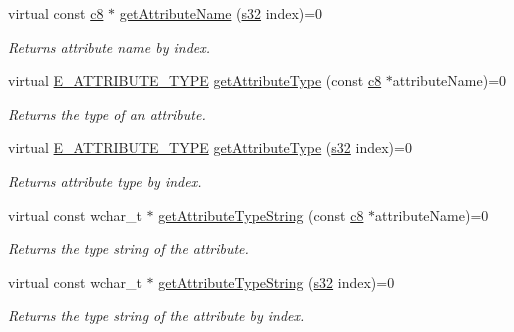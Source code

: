 \begin{DoxyCompactItemize}
virtual const \hyperlink{namespaceirr_a9395eaea339bcb546b319e9c96bf7410}{c8} $\ast$ \hyperlink{classirr_1_1io_1_1IAttributes_adee33f518d95a1ca17146bb055c6e5f3}{get\+Attribute\+Name} (\hyperlink{namespaceirr_ac66849b7a6ed16e30ebede579f9b47c6}{s32} index)=0
\begin{DoxyCompactList}\small\item\em Returns attribute name by index. \end{DoxyCompactList}\item 
virtual \hyperlink{namespaceirr_1_1io_a874a5f14dbe2e45c40c2bb29e9f0ebcb}{E\+\_\+\+A\+T\+T\+R\+I\+B\+U\+T\+E\+\_\+\+T\+Y\+PE} \hyperlink{classirr_1_1io_1_1IAttributes_af14805d54f8cfae0a76751d13931390a}{get\+Attribute\+Type} (const \hyperlink{namespaceirr_a9395eaea339bcb546b319e9c96bf7410}{c8} $\ast$attribute\+Name)=0
\begin{DoxyCompactList}\small\item\em Returns the type of an attribute. \end{DoxyCompactList}\item 
virtual \hyperlink{namespaceirr_1_1io_a874a5f14dbe2e45c40c2bb29e9f0ebcb}{E\+\_\+\+A\+T\+T\+R\+I\+B\+U\+T\+E\+\_\+\+T\+Y\+PE} \hyperlink{classirr_1_1io_1_1IAttributes_a2cb0eb3befcbf7feb2bbdd4676c53954}{get\+Attribute\+Type} (\hyperlink{namespaceirr_ac66849b7a6ed16e30ebede579f9b47c6}{s32} index)=0
\begin{DoxyCompactList}\small\item\em Returns attribute type by index. \end{DoxyCompactList}\item 
virtual const wchar\+\_\+t $\ast$ \hyperlink{classirr_1_1io_1_1IAttributes_a6a460acccdbf5b2f8eac8d2bd6a1e428}{get\+Attribute\+Type\+String} (const \hyperlink{namespaceirr_a9395eaea339bcb546b319e9c96bf7410}{c8} $\ast$attribute\+Name)=0
\begin{DoxyCompactList}\small\item\em Returns the type string of the attribute. \end{DoxyCompactList}\item 
virtual const wchar\+\_\+t $\ast$ \hyperlink{classirr_1_1io_1_1IAttributes_a2dc2dffe38bc50222615f40a7ca7711a}{get\+Attribute\+Type\+String} (\hyperlink{namespaceirr_ac66849b7a6ed16e30ebede579f9b47c6}{s32} index)=0
\begin{DoxyCompactList}\small\item\em Returns the type string of the attribute by index. \end{DoxyCompactList}\item 

\end{DoxyCompactItemize}
